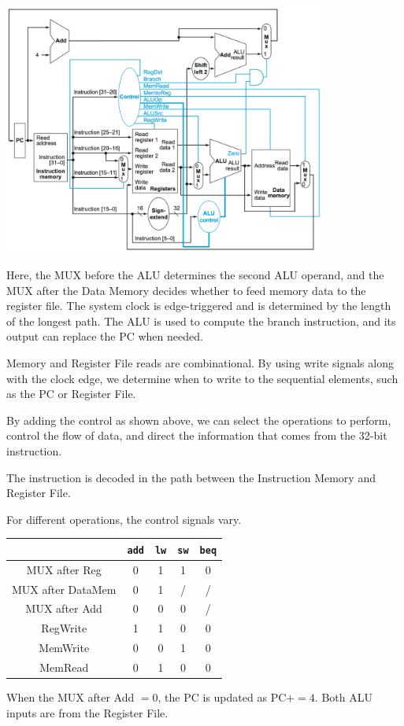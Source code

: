 \begin{center}
  \includegraphics[width=0.8\textwidth]{Figure/Datapath.png}
\end{center}

Here, the MUX before the ALU determines the second ALU operand, and the MUX after the Data Memory decides whether to feed memory data to the register file. The system clock is edge-triggered and is determined by the length of the longest path. The ALU is used to compute the branch instruction, and its output can replace the PC when needed.

Memory and Register File reads are combinational. By using write signals along with the clock edge, we determine when to write to the sequential elements, such as the PC or Register File.

By adding the control as shown above, we can select the operations to perform, control the flow of data, and direct the information that comes from the 32-bit instruction.

\begin{remark}
  The instruction is decoded in the path between the Instruction Memory and Register File.
\end{remark}

For different operations, the control signals vary.
\begin{table}[H]
  \centering
  \begin{tabular}{c|c|c|c|c}
      \toprule
       & \verb|add| & \verb|lw| & \verb|sw| & \verb|beq|  \\
    \midrule
      MUX after Reg & 0 & 1 & 1 & 0  \\
      MUX after DataMem & 0 & 1 & / & /  \\
      MUX after Add & 0 & 0 & 0 & /  \\
      RegWrite & 1 & 1 & 0 & 0  \\
      MemWrite & 0 & 0 & 1 & 0  \\
      MemRead & 0 & 1 & 0 & 0  \\
      \bottomrule
  \end{tabular}
\end{table}

When the MUX after Add \(= 0\), the PC is updated as \(\text{PC} += 4\). Both ALU inputs are from the Register File.
